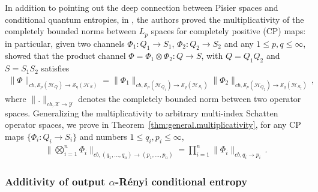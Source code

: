 \documentclass[11pt]{article}
\newcommand{\1}{\ensuremath{\mathbbm{1}}}
\theoremstyle{newdefinition}
\theoremstyle{newplain}
\theoremstyle{myplain}
\begin{document}
In addition to pointing out the deep connection between Pisier spaces and conditional quantum entropies, in \cite{Devetak.2006}, the authors proved the multiplicativity of the completely bounded norms between $L_p$ spaces for completely positive (CP) maps: in particular, given two channels $\Phi_1:Q_1\to S_1$, $\Phi_2:Q_2\to S_2$ and any $1\leq p,q \le \infty$, \cite{Devetak.2006} showed that the product channel $\Phi=\Phi_1\otimes\Phi_2:Q\to S$, with $Q = Q_1Q_2$ and $S=S_1S_2$ satisfies 
\begin{align}
    \|\Phi\|_{cb, \mathcal{S}_p(\mathcal{H}_{Q}) \to \mathcal{S}_q(\mathcal{H}_{S})} = \|\Phi_1\|_{cb, \mathcal{S}_p(\mathcal{H}_{Q_1}) \to \mathcal{S}_q(\mathcal{H}_{S_1})}\|\Phi_2\|_{cb, \mathcal{S}_p(\mathcal{H}_{Q_2}) \to \mathcal{S}_q(\mathcal{H}_{S_2})}\,,
\end{align}
where $\|.\|_{cb,\mathcal{X}\to\mathcal{Y}}$ denotes the completely bounded norm between two operator spaces.
Generalizing the multiplicativity to arbitrary multi-index Schatten operator spaces, we prove in Theorem~\ref{thm:general.multiplicativity}, for any CP maps $\{\Phi_i:Q_i\to S_i\}$ and numbers $1\leq q_i,p_i\leq\infty$,
\begin{align}
    \bigg\|\bigotimes_{i=1}^n\Phi_i\bigg\|_{cb,(q_1,...,q_n)\to (p_1,...,p_n)} = \prod_{i=1}^n\|\Phi_i\|_{cb,q_i\to p_i}\,.
\end{align}




\subsubsection{Additivity of output $\alpha$-Rényi conditional entropy}
\end{document}
